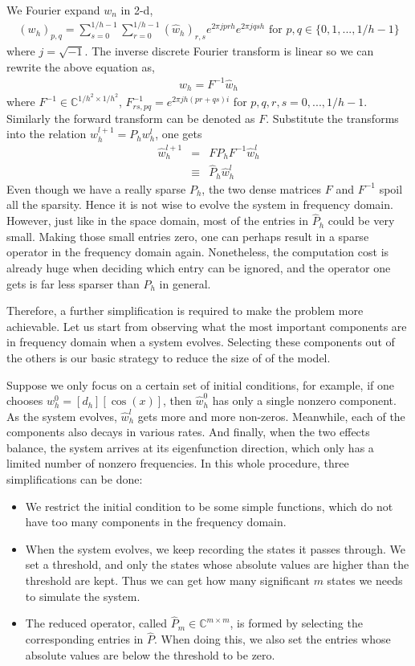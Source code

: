  We Fourier expand $w_n$ in
2-d,
\begin{eqnarray}
(w_h)_{p,q} =\sum_{s=0}^{1/h-1} \sum_{r=0}^{1/h-1} (\hat{w}_h)_{r,s}
e^{2 \pi j p rh} e^{2 \pi j q sh}  \mbox{   for }p,q \in
\{0,1,...,1/h-1\}
\end{eqnarray}
where $j = \sqrt{-1}$. The inverse discrete Fourier transform is
linear so we can rewrite the above equation as,
\begin{eqnarray}
w_h = F^{-1} \hat{w}_h
\end{eqnarray}
where $F^{-1} \in \mathbb{C}^{1/h^2 \times 1/h^2}$, $F^{-1}_{rs,pq}
=e^{2 \pi j h ({pr}+{qs}) i}$ for $p,q,r,s = 0,...,1/h-1$. Similarly the
forward transform can be denoted as $F$. Substitute the transforms
into the relation $w_h^{l+1} = P_h w_h^l$, one gets
\begin{eqnarray}
\hat{w}_h^{l+1} &=&F P_h F^{-1} \hat{w}_h^l \nonumber\\
          &\equiv& \hat{P}_h \hat{w}_h^l
\end{eqnarray}
Even though we have a really sparse $P_h$, the two dense matrices
$F$ and $F^{-1}$ spoil all the sparsity. Hence it is not wise to
evolve the system in frequency domain. However, just like in the
space domain, most of the entries in $\hat{P}_h$ could be very small.
Making those small entries zero, one can perhaps result in a sparse
operator in the frequency domain again. Nonetheless, the computation
cost is already huge when deciding which entry can be ignored, and
the operator one gets is far less sparser than $P_h$ in general.

Therefore, a further simplification is required to make the problem
more achievable. Let us start from observing what the most important
components are in frequency domain when a system evolves. Selecting
these components out of the others is our basic strategy to reduce
the size of of the model.


Suppose we only focus on a certain set of initial conditions, for
example, if one chooses $w_h^0 = [d_h][\cos(x)]$, then $\hat{w}_h^0$
has only a single nonzero component. As the system evolves,
$\hat{w}_h^l$ gets more and more non-zeros. Meanwhile, each of the
components also decays in various rates. And finally, when the two
effects balance, the system arrives at its eigenfunction direction,
which only has a limited number of nonzero frequencies. In this
whole procedure, three simplifications can be done:
\begin{itemize}
  \item We restrict the initial condition to be some simple
  functions, which do not have too many components in the frequency
  domain.
  \item When the system evolves, we keep recording the states it
  passes through. We set a threshold, and only the states whose
  absolute values are higher than the threshold are kept. Thus we can get how
  many significant $m$ states we needs to simulate the system.
  \item The reduced operator, called $\hat{P}_m \in \mathbb{C}^{m \times m}$,
  is formed by selecting the corresponding entries in $\hat{P}$. When
  doing this, we also set the entries whose absolute values are
  below the threshold to be zero.
\end{itemize}

